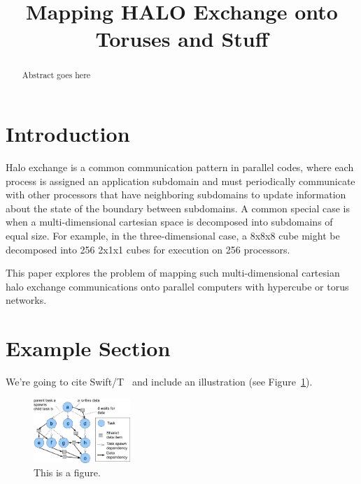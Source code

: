 \documentclass[conference,10pt]{IEEEtran}
\begin{document}
\setlength{\pdfpageheight}{\paperheight}
\setlength{\pdfpagewidth}{\paperwidth}


\title{Mapping HALO Exchange onto Toruses and Stuff}

\author{
}

\maketitle

 
\begin{abstract}
Abstract goes here
\end{abstract}

\section{Introduction}

Halo exchange is a common communication pattern in parallel codes, where
each process is assigned an application subdomain and must periodically
communicate with other processors that have neighboring subdomains to
update information about the state of the boundary between subdomains.
A common special case is when a multi-dimensional cartesian space is
decomposed into subdomains of equal size.  For example, in the three-dimensional
case, a 8x8x8 cube might be decomposed into 256 2x1x1 cubes for execution on 256 processors.

This paper explores the problem of mapping such multi-dimensional cartesian
halo exchange communications onto parallel computers with hypercube or
torus networks.

\section{Example Section}

We're going to cite Swift/T~\cite{SwiftT_2013} and include an illustration
(see Figure~\ref{fig:task-data}).

\label{sect:ddt-model}
\begin{figure}
  \center
  \includegraphics[width=0.325\textwidth]{fig/task-data}
  \caption{This is a figure.
    \label{fig:task-data}}
\end{figure}
\end{document}
